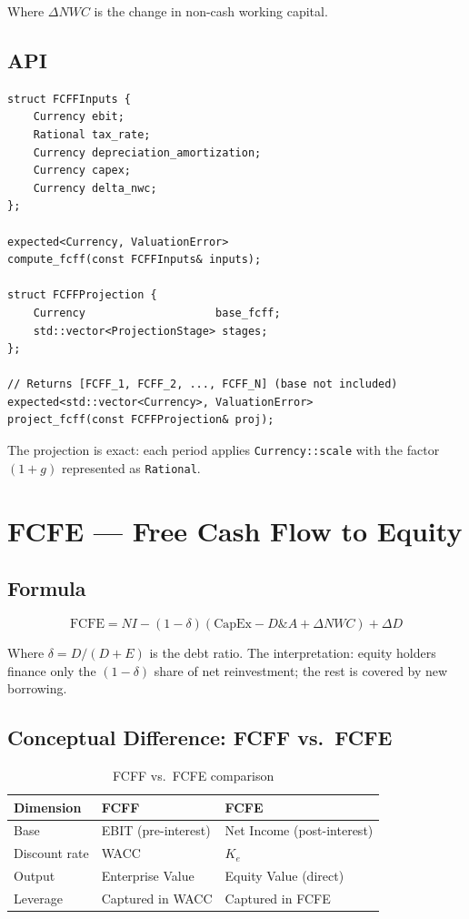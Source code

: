 \documentclass[12pt, a4paper, oneside]{book}
\newcommand{\FCFE}{\ensuremath{\mathrm{FCFE}}}
\newcommand{\Ke}{K_e}
\begin{document}
Where $\Delta NWC$ is the change in non-cash working capital.

\subsection{API}

\begin{lstlisting}[style=cpp]
struct FCFFInputs {
    Currency ebit;
    Rational tax_rate;
    Currency depreciation_amortization;
    Currency capex;
    Currency delta_nwc;
};

expected<Currency, ValuationError>
compute_fcff(const FCFFInputs& inputs);

struct FCFFProjection {
    Currency                    base_fcff;
    std::vector<ProjectionStage> stages;
};

// Returns [FCFF_1, FCFF_2, ..., FCFF_N] (base not included)
expected<std::vector<Currency>, ValuationError>
project_fcff(const FCFFProjection& proj);
\end{lstlisting}

The projection is exact: each period applies \texttt{Currency::scale} with
the factor $(1+g)$ represented as \texttt{Rational}.

\section{FCFE --- Free Cash Flow to Equity}

\subsection{Formula}

\begin{equation}
  \FCFE = NI - (1-\delta)(\text{CapEx} - D\&A + \Delta NWC) + \Delta D
  \label{eq:fcfe}
\end{equation}

Where $\delta = D/(D+E)$ is the debt ratio. The interpretation:
equity holders finance only the $(1-\delta)$ share of net reinvestment;
the rest is covered by new borrowing.

\subsection{Conceptual Difference: FCFF vs.\ FCFE}

\begin{table}[h]
\centering
\caption{FCFF vs.\ FCFE comparison}
\begin{tabular}{lll}
\toprule
\textbf{Dimension} & \textbf{FCFF} & \textbf{FCFE} \\
\midrule
Base & EBIT (pre-interest) & Net Income (post-interest) \\
Discount rate & WACC & $\Ke$ \\
Output & Enterprise Value & Equity Value (direct) \\
Leverage & Captured in WACC & Captured in FCFE \\
\bottomrule
\end{tabular}
\end{table}
\end{document}
